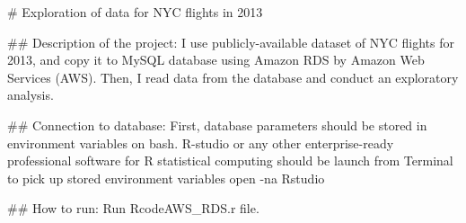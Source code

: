 # Exploration of data for NYC flights in 2013 

## Description of the project:
I use publicly-available dataset of NYC flights for 2013, and copy it to MySQL database using Amazon RDS by Amazon Web Services (AWS). Then, I read data from the database and conduct an exploratory analysis. 

## Connection to database:
First, database parameters should be stored in environment variables on bash.
R-studio or any other enterprise-ready professional software for R statistical computing should be launch from Terminal to pick up stored environment variables
open -na Rstudio

## How to run:
Run RcodeAWS_RDS.r file.


